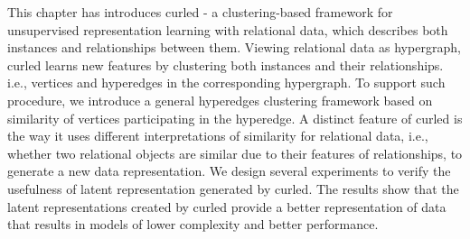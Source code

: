 This chapter has introduces \gls{curled} - a clustering-based framework for unsupervised representation learning with relational data, which describes both instances and relationships between them.
Viewing relational data as hypergraph, \gls{curled} learns new features by clustering both instances and their relationships. i.e., vertices and hyperedges in the corresponding hypergraph.
To support such procedure, we introduce a general hyperedges clustering framework based on similarity of vertices participating in the hyperedge.
A distinct feature of \gls{curled} is the way it uses different interpretations of similarity for relational data, i.e., whether two relational objects are similar due to their features of relationships, to generate a new data representation.
We design several experiments to verify the usefulness of latent representation generated by \gls{curled}.
The results show that the latent representations created by \gls{curled} provide a better representation of data that results in models of lower complexity and better performance. 




\cleardoublepage

